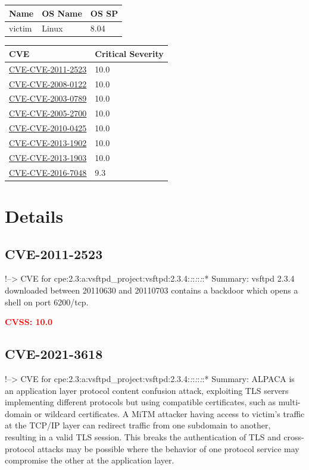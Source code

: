 \documentclass[a4paper, 12pt]{article}
\begin{document}
\begin{longtable}[]{@{}lll@{}}
\toprule
Name & OS Name & OS SP\tabularnewline
\midrule
\endhead
victim & Linux & 8.04\tabularnewline
\bottomrule
\end{longtable}

\begin{longtable}[]{@{}ll@{}}
\toprule
CVE & Critical Severity\tabularnewline
\midrule
\endhead
\protect\hyperlink{CVE-2011-2523}{CVE-CVE-2011-2523} &
{10.0}\tabularnewline
\protect\hyperlink{CVE-2008-0122}{CVE-CVE-2008-0122} &
{10.0}\tabularnewline
\protect\hyperlink{CVE-2003-0789}{CVE-CVE-2003-0789} &
{10.0}\tabularnewline
\protect\hyperlink{CVE-2005-2700}{CVE-CVE-2005-2700} &
{10.0}\tabularnewline
\protect\hyperlink{CVE-2010-0425}{CVE-CVE-2010-0425} &
{10.0}\tabularnewline
\protect\hyperlink{CVE-2013-1902}{CVE-CVE-2013-1902} &
{10.0}\tabularnewline
\protect\hyperlink{CVE-2013-1903}{CVE-CVE-2013-1903} &
{10.0}\tabularnewline
\protect\hyperlink{CVE-2016-7048}{CVE-CVE-2016-7048} &
{9.3}\tabularnewline
\bottomrule
\end{longtable}

\hypertarget{details}{%
\section{Details}\label{details}}

\hypertarget{cve-2011-2523}{%
\subsection{CVE-2011-2523}\label{cve-2011-2523}}

!--\textgreater{} CVE for
cpe:2.3:a:vsftpd\_project:vsftpd:2.3.4:\emph{:}:\emph{:}:\emph{:}:*
Summary: vsftpd 2.3.4 downloaded between 20110630 and 20110703 contains
a backdoor which opens a shell on port 6200/tcp.

\textbf{\textcolor{red}{CVSS: 10.0}}

\hypertarget{cve-2021-3618}{%
\subsection{CVE-2021-3618}\label{cve-2021-3618}}

!--\textgreater{} CVE for
cpe:2.3:a:vsftpd\_project:vsftpd:2.3.4:\emph{:}:\emph{:}:\emph{:}:*
Summary: ALPACA is an application layer protocol content confusion
attack, exploiting TLS servers implementing different protocols but
using compatible certificates, such as multi-domain or wildcard
certificates. A MiTM attacker having access to victim's traffic at the
TCP/IP layer can redirect traffic from one subdomain to another,
resulting in a valid TLS session. This breaks the authentication of TLS
and cross-protocol attacks may be possible where the behavior of one
protocol service may compromise the other at the application layer.
\end{document}
